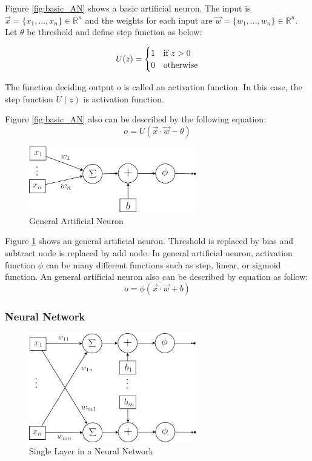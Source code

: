 \documentclass[draft,dvipsnames]{drexel-thesis}
\begin{document}
\begin{thesis}
Figure \ref{fig:basic_AN} shows a basic artificial neuron. The input is $\vec{x} = \{x_1, ..., x_n\} \in \mathbb{R}^n$ and the weights for each input are $\vec{w} = \{w_1, ..., w_n\} \in \mathbb{R}^n$. Let $\theta$ be threshold and define step function as below:

$$U(z)=
	\begin{cases}
		\hfill 1 \hfill & \text{if $z > 0$} \\
		\hfill 0 \hfill & \text{otherwise} \\
	\end{cases}
$$

The function deciding output $o$ is called an activation function. In this case, the step function $U(z)$ is activation function.

Figure \ref{fig:basic_AN} also can be described by the following equation:
$$ o = U(\vec{x}\cdot\vec{w}-\theta)$$

\begin{figure}[t!]
    \centering
    \includegraphics[width=0.65\textwidth]{pictures/figures/general_AN.png}
    \caption{General Artificial Neuron}
    \label{fig:general_AN}
\end{figure}

Figure \ref{fig:general_AN} shows an general artificial neuron. Threshold is replaced by bias and subtract node is replaced by add node. In general artificial neuron, activation function $\phi$ can be many different functions such as step, linear, or sigmoid function. An general artificial neuron also can be described by equation as follow:
$$o = \phi(\vec{x}\cdot\vec{w}+b)$$


\subsubsection{Neural Network}\label{subsubsec:NN}

\begin{figure}[t!]
    \centering
    \includegraphics[width=0.65\textwidth]{pictures/figures/detail_NN.png}
    \caption{Single Layer in a Neural Network}
    \label{fig:detail_NN}
\end{figure}


\end{thesis}
\end{document}
